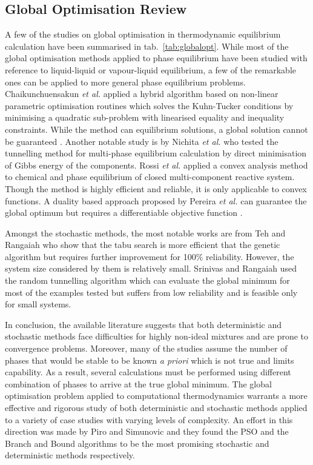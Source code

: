 	\subsection{Global Optimisation Review}
	 A few of the studies on global optimisation in thermodynamic equilibrium calculation have been summarised in tab.~\ref{tab:globalopt}. While most of the global optimisation methods applied to phase equilibrium have been studied with reference to liquid-liquid or vapour-liquid equilibrium, a few of the remarkable ones can be applied to more general phase equilibrium problems. Chaikunchuensakun \textit{et al.} \cite{Chaikunchuensakun:2002aa} applied a hybrid algorithm based on non-linear parametric optimisation routines which solves the Kuhn-Tucker conditions by minimising a quadratic sub-problem with linearised equality and inequality constraints. While the method can equilibrium solutions, a global solution cannot be guaranteed \cite{Zhang11}. Another notable study is by Nichita \textit{et al.} \cite{Nichita02} who tested the tunnelling method for multi-phase equilibrium calculation by direct minimisation of Gibbs energy of the components. Rossi \textit{et al.} \cite{ROSSI20111226} applied a convex analysis method to chemical and phase equilibrium of closed multi-component reactive system. Though the method is highly efficient and reliable, it is only applicable to convex functions. A duality based approach proposed by Pereira \textit{et al.} \cite{PEREIRA20101} can guarantee the global optimum but requires a differentiable objective function \cite{Zhang11}.

	 Amongst the stochastic methods, the most notable works are from Teh and Rangaiah \cite{Teh03} who show that the tabu search is more efficient that the genetic algorithm but requires further improvement for 100\% reliability. However, the system size considered by them is relatively small. Srinivas and Rangaiah \cite{Srinivas06} used the random tunnelling algorithm which can evaluate the global minimum for most of the examples tested but suffers from low reliability and is feasible only for small systems.

	 In conclusion, the available literature suggests that both deterministic and stochastic methods face difficulties for highly non-ideal mixtures and are prone to convergence problems. Moreover, many of the studies assume the number of phases that would be stable to be known \textit{a priori} which is not true and limits capability. As a result, several calculations must be performed using different combination of phases to arrive at the true global minimum. The global optimisation problem applied to computational thermodynamics warrants a more effective and rigorous study of both deterministic and stochastic methods applied to a variety of case studies with varying levels of complexity. An effort in this direction was made by Piro and Simunovic \cite{Piro16} and they found the PSO and the Branch and Bound algorithms to be the most promising stochastic and deterministic methods respectively.

